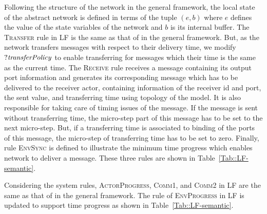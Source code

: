 
Following the structure of the network in the general framework, the local state of the abstract network is defined in terms of the tuple $(e,b)$ where $e$ defines the value of the state variables of the network and $b$ is its internal buffer. The \textsc{Transfer} rule in LF is the same as that of in the general framework. But, as the network transfers messages with respect to their delivery time, we modify  $?{\it transferPolicy}$ to enable transferring for messages which their time is the same as the current time. The \textsc{Receive} rule receives a message containing its output port information and generates its corresponding message which has to be delivered to the receiver actor, containing information of the receiver id and port, the sent value, and transferring time using topology of the model. It is also responsible for taking care of timing issues of the message. If the message is sent without transferring time, the micro-step part of this message has to be set to the next micro-step.  But, if a transferring time is associated to binding of the ports of this message, the micro-step of transferring time has to be set to zero. Finally, rule \textsc{EnvSync} is defined to illustrate the minimum time progress which enables network to deliver a message. These three rules are shown in Table~\ref{Tab::LF-semantic}.

Considering the system rules, \textsc{ActorProgress}, \textsc{Comm1}, and \textsc{Comm2} in LF are the same as that of in the general framework. The rule of \textsc{EnvProgress} in LF is updated to support time progress as shown in Table~\ref{Tab::LF-semantic}.

